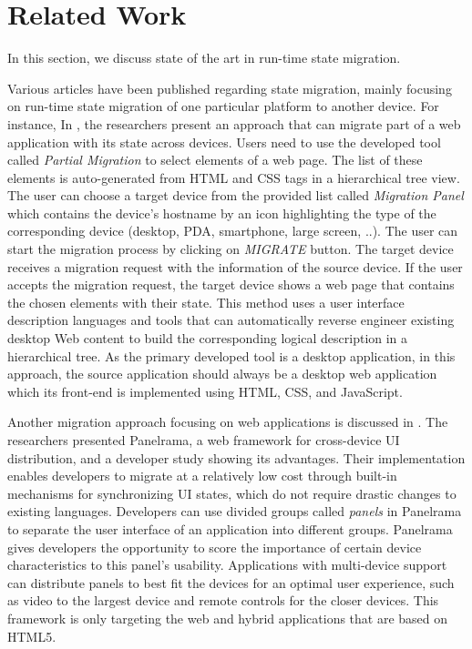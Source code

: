 \chapter{Related Work}
In this section, we discuss state of the art in run-time state migration.
\label{ch:related}

Various articles have been published regarding state migration, mainly focusing on run-time state migration of one particular platform to another device. For instance, In \cite{r1-10.1145/1851600.1851653}, the researchers present an approach that can migrate part of a web application with its state across devices. Users need to use the developed tool called \textit{Partial Migration} to select elements of a web page. The list of these elements is auto-generated from HTML and CSS tags in a hierarchical tree view. The user can choose a target device from the provided list called \textit{Migration Panel} which contains the device’s hostname by an icon highlighting the type of the corresponding device (desktop, PDA, smartphone, large screen, ..). The user can start the migration process by clicking on \textit{MIGRATE} button. The target device receives a migration request with the information of the source device. If the user accepts the migration request, the target device shows a web page that contains the chosen elements with their state. This method uses a user interface description languages \cite{r5-maria-10.1145/1614390.1614394} and tools that can automatically reverse engineer existing desktop Web content to build the corresponding logical description in a hierarchical tree. As the primary developed tool is a desktop application, in this approach, the source application should always be a desktop web application which its front-end is implemented using HTML, CSS, and JavaScript.

Another migration approach focusing on web applications is discussed in \cite{r2-zaplata}. The researchers presented Panelrama, a web framework for cross-device UI distribution, and a developer study showing its advantages. Their implementation enables developers to migrate at a relatively low cost through built-in mechanisms for synchronizing UI states, which do not require drastic changes to existing languages. Developers can use divided groups called \textit{panels} in Panelrama to separate the user interface of an application into different groups. Panelrama gives developers the opportunity to score the importance of certain device characteristics to this panel’s usability. Applications with multi-device support can distribute panels to best fit the devices for an optimal user experience, such as video to the largest device and remote controls for the closer devices. This framework is only targeting the web and hybrid applications that are based on HTML5.

